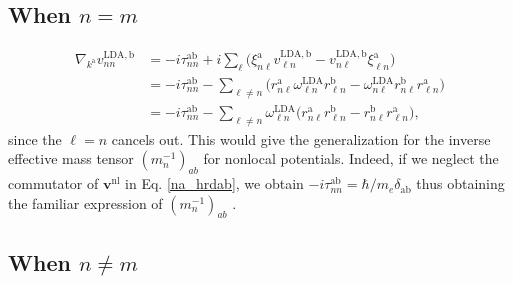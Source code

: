 
\subsection{When \texorpdfstring{$n=m$}{n=m}}

\begin{align}\label{ntita}
\nabla_{k^{\mathrm{a}}}v^{\mathrm{LDA},\mathrm{b}}_{nn}&=
-i\tau^{\mathrm{a}\mathrm{b}}_{nn}
+i
\sum_{\ell}
\bigg(
\xi^{\mathrm{a}}_{n\ell}
v^{\mathrm{LDA},\mathrm{b}}_{\ell n}
-
v^{\mathrm{LDA},\mathrm{b}}_{n\ell}
\xi^{\mathrm{a}}_{\ell n}
\bigg)
\nonumber\\
&=
-i\tau^{\mathrm{a}\mathrm{b}}_{nn}
-
\sum_{\ell\ne n}
\bigg(
r^{\mathrm{a}}_{n\ell}
\omega^\mathrm{LDA}_{\ell n}
r^\mathrm{b}_{\ell n}
-
\omega^\mathrm{LDA}_{n\ell}
r^\mathrm{b}_{n\ell}
r^{\mathrm{a}}_{\ell n}
\bigg)
\nonumber\\
&=
-i\tau^{\mathrm{a}\mathrm{b}}_{nn}
-
\sum_{\ell\ne n}
\omega^\mathrm{LDA}_{\ell n}
\bigg(
r^{\mathrm{a}}_{n\ell}
r^\mathrm{b}_{\ell n}
-
r^\mathrm{b}_{n\ell}
r^{\mathrm{a}}_{\ell n}
\bigg)
,
\end{align}
since the $\ell=n$ cancels out. This would give the generalization for the
inverse effective mass tensor $(m_n^{-1})_{ab}$ for nonlocal potentials. Indeed,
if we neglect the commutator of $\mathbf{v}^\mathrm{nl}$ in
Eq. \eqref{na_hrdab}, we obtain
$-i\tau^{\mathrm{a}\mathrm{b}}_{nn}=\hbar/m_e\delta_{\mathrm{a}\mathrm{b}}$ thus
obtaining the  familiar expression of $(m_n^{-1})_{ab}$ \cite{ashcroftbook}.



\subsection{When \texorpdfstring{$n\ne m$}{n!=m}}


